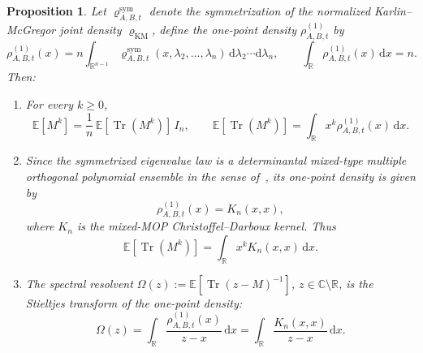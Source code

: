 \documentclass[11pt,a4paper]{article}
\newtheorem{proposition}[theorem]{Proposition}
\theoremstyle{definition}\newtheorem{definition}[theorem]{Definition}
\theoremstyle{remark}\newtheorem{remark}[theorem]{Remark}
\numberwithin{equation}{section}
\DeclareMathOperator{\Tr}{Tr}
\newcommand{\R}{\mathbb{R}}
\newcommand{\C}{\mathbb{C}}
\newcommand{\dd}{\mathrm{d}}
\newcommand{\EE}{\mathbb{E}}
\begin{document}
\begin{proposition}
\label{prop:spectral_kernel_resolvent}
Let  $\varrho^{\mathrm{sym}}_{A,B,t}$ denote the symmetrization of  the normalized Karlin--McGregor joint density  $\varrho_\mathrm{KM}$,   define the one-point density $\rho^{(1)}_{A,B,t}$ by
\begin{equation} 
\rho^{(1)}_{A,B,t}(x)
=
n\int_{\R^{n-1}}
\varrho^{\mathrm{sym}}_{A,B,t}(x,\lambda_2,\dots,\lambda_n)\,
\dd\lambda_2\cdots \dd\lambda_n,
\qquad
\int_{\R}\rho^{(1)}_{A,B,t}(x)\,\dd x=n.
\end{equation}
Then:
\begin{enumerate}
\item[\textup{(i)}] For every $k\ge0$,
\begin{equation}\label{eq:trace_moment_one_point_density}
\EE[M^k]
=
\frac1n\,\EE[\Tr(M^k)]\,I_n,
\qquad
\EE[\Tr(M^k)]
=
\int_{\R} x^k \rho^{(1)}_{A,B,t}(x)\,\dd x.
\end{equation}

\item[\textup{(ii)}] Since the symmetrized eigenvalue law is a determinantal mixed-type multiple orthogonal polynomial ensemble in the sense of~\cite{DaemsKuijlaars2007,Kuijlaars2010}, its one-point density is given by
\begin{equation}
\rho^{(1)}_{A,B,t}(x)=K_n(x,x),
\end{equation}
where $K_n$ is the mixed-MOP Christoffel--Darboux kernel. Thus
\begin{equation} 
\EE[\Tr(M^k)]
=
\int_{\R} x^k K_n(x,x)\,\dd x.
\end{equation}

\item[\textup{(iii)}] The spectral resolvent
$\Omega(z):=\EE[\Tr(z-M)^{-1}]$, $z\in\C\setminus\R$,
is the Stieltjes transform of the one-point density:
\begin{equation}\label{eq:resolvent_one_point}
\Omega(z)
=
\int_{\R}\frac{\rho^{(1)}_{A,B,t}(x)}{z-x}\,\dd x
=
\int_{\R}\frac{K_n(x,x)}{z-x}\,\dd x.
\end{equation}
\end{enumerate}
\end{proposition}
\end{document}
